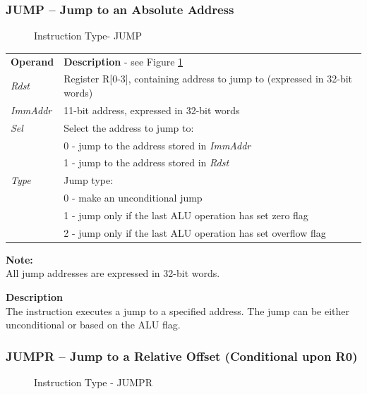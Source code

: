 \documentclass[main\_\_EN.tex]{subfiles}
\begin{document}
\subsubsection{JUMP – Jump to an Absolute Address} \label{paragraph:JUMP}

%
%
%
%
%
%
%
%
\begin{figure}[!ht ]
    \centering
    \caption{Instruction Type- JUMP}
    \label{figure:JUMP}
\end{figure}

\begin{tabular}{ l l }
\textbf{Operand} & \textbf{Description} - see Figure  \ref{figure:JUMP} \\
\textit{Rdst} & Register R[0-3], containing address to jump to (expressed in 32-bit words)\\
\textit{ImmAddr} & 11-bit address, expressed in 32-bit words\\
\textit{Sel} & Select the address to jump to: \\
 & 0 - jump to the address stored in \textit{ ImmAddr}\\
 & 1 - jump to the address stored in \textit{Rdst} \\
\textit{Type} & Jump type: \\
 & 0 - make an unconditional jump \\
 & 1 - jump only if the last ALU operation has set zero flag \\
 & 2 - jump only if the last ALU operation has set overflow flag
\end{tabular}

\textbf{Note:} \\
All jump addresses are expressed in 32-bit words.

\textbf{ Description } \\
The instruction executes a jump to a specified address. The jump can be either unconditional or based on the ALU flag.

\subsubsection{JUMPR – Jump to a Relative Offset (Conditional upon R0)}


%
%
%
%
%
\begin{figure}[!ht ]
    \centering
    \caption{Instruction Type - JUMPR}
    \label{figure:JUMPR}
\end{figure}
\end{document}
